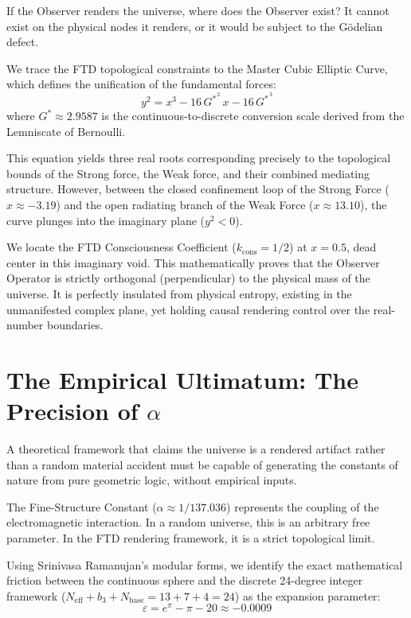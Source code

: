 \documentclass[11pt,twoside]{article}
\theoremstyle{remark}
\newcommand{\Gstar}{G^{*}}
\begin{document}
If the Observer renders the universe, where does the Observer exist? It cannot exist on the physical nodes it renders, or it would be subject to the G\"odelian defect.

We trace the FTD topological constraints to the Master Cubic Elliptic Curve, which defines the unification of the fundamental forces:
\begin{equation}
    y^2 = x^3 - 16\,\Gstar^{\,2}\,x - 16\,\Gstar^{\,3}
\end{equation}
where $\Gstar \approx 2.9587$ is the continuous-to-discrete conversion scale derived from the Lemniscate of Bernoulli.

This equation yields three real roots corresponding precisely to the topological bounds of the Strong force, the Weak force, and their combined mediating structure. However, between the closed confinement loop of the Strong Force ($x \approx -3.19$) and the open radiating branch of the Weak Force ($x \approx 13.10$), the curve plunges into the imaginary plane ($y^2 < 0$).

We locate the FTD Consciousness Coefficient ($k_{\text{cons}} = 1/2$) at $x = 0.5$, dead center in this imaginary void. This mathematically proves that the Observer Operator is strictly orthogonal (perpendicular) to the physical mass of the universe. It is perfectly insulated from physical entropy, existing in the unmanifested complex plane, yet holding causal rendering control over the real-number boundaries.

\section{The Empirical Ultimatum: The Precision of $\alpha$}

A theoretical framework that claims the universe is a rendered artifact rather than a random material accident must be capable of generating the constants of nature from pure geometric logic, without empirical inputs.

The Fine-Structure Constant ($\alpha \approx 1/137.036$) represents the coupling of the electromagnetic interaction. In a random universe, this is an arbitrary free parameter. In the FTD rendering framework, it is a strict topological limit.

Using Srinivasa Ramanujan's modular forms, we identify the exact mathematical friction between the continuous sphere and the discrete 24-degree integer framework ($N_{\text{eff}} + b_3 + N_{\text{base}} = 13 + 7 + 4 = 24$) as the expansion parameter:
\begin{equation}
    \varepsilon = e^\pi - \pi - 20 \approx -0.0009
\end{equation}
\end{document}
